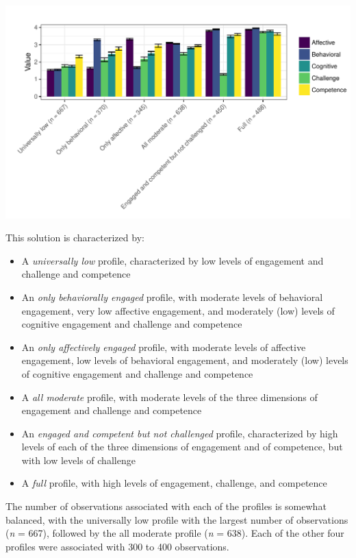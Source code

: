\documentclass[]{msu-thesis}
\providecommand{\tightlist}{%
  \setlength{\itemsep}{0pt}\setlength{\parskip}{0pt}}
\theoremstyle{definition}
\theoremstyle{definition}
\theoremstyle{definition}
\theoremstyle{remark}
\begin{document}
\begin{center}\includegraphics[width=1\linewidth]{rosenberg-dissertation_files/figure-latex/unnamed-chunk-10-2} \end{center}

This solution is characterized by:

\begin{itemize}
\tightlist
\item
  A \emph{universally low} profile, characterized by low levels of
  engagement and challenge and competence
\item
  An \emph{only behaviorally engaged} profile, with moderate levels of
  behavioral engagement, very low affective engagement, and moderately
  (low) levels of cognitive engagement and challenge and competence
\item
  An \emph{only affectively engaged} profile, with moderate levels of
  affective engagement, low levels of behavioral engagement, and
  moderately (low) levels of cognitive engagement and challenge and
  competence
\item
  A \emph{all moderate} profile, with moderate levels of the three
  dimensions of engagement and challenge and competence
\item
  An \emph{engaged and competent but not challenged} profile,
  characterized by high levels of each of the three dimensions of
  engagement and of competence, but with low levels of challenge
\item
  A \emph{full} profile, with high levels of engagement, challenge, and
  competence
\end{itemize}

The number of observations associated with each of the profiles is
somewhat balanced, with the universally low profile with the largest
number of observations (\emph{n} = 667), followed by the all moderate
profile (\emph{n} = 638). Each of the other four profiles were
associated with 300 to 400 observations.
\end{document}
